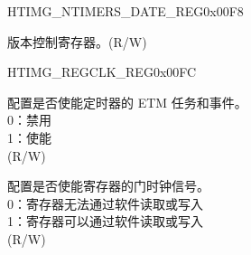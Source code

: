 \begin{register}{H}{TIMG\_NTIMERS\_DATE\_REG}{0x00F8}\label{regdesc:TIMGNTIMERSDATEREG}
%
%
\regnewline%
\begin{regdesc}\begin{reglist}
\label{fielddesc:TIMGNTIMGSDATE}\item [TIMG\_NTIMGS\_DATE] 版本控制寄存器。(R/W)
\end{reglist}\end{regdesc}
\end{register}


\begin{register}{H}{TIMG\_REGCLK\_REG}{0x00FC}\label{regdesc:TIMGREGCLKREG}
%
%
%
%
\regnewline%
\begin{regdesc}\begin{reglist}
\label{fielddesc:TIMGETMEN}\item [TIMG\_ETM\_EN] 配置是否使能定时器的 ETM 任务和事件。\\
0：禁用 \\
1：使能 \\
(R/W)
\label{fielddesc:TIMGCLKEN}\item [TIMG\_CLK\_EN] 配置是否使能寄存器的门时钟信号。\\
0：寄存器无法通过软件读取或写入 \\
1：寄存器可以通过软件读取或写入 \\
 (R/W)
\end{reglist}\end{regdesc}
\end{register}
